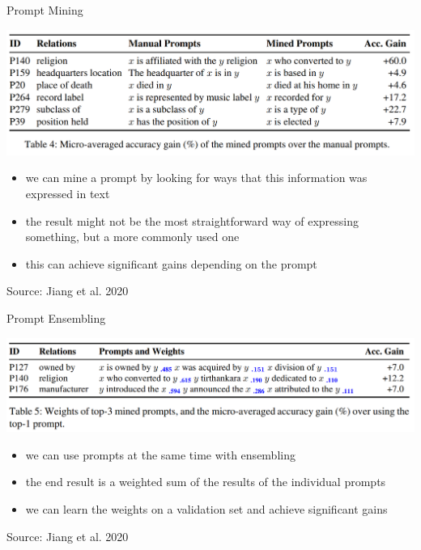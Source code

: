 \begin{vbframe}{Prompt Mining}
	\vfill

	\includegraphics[width=\textwidth]{evaluation_figures/mined_prompts.png}

	\begin{itemize}
		\item we can mine a prompt by looking for ways that this information was expressed in text
		\item the result might not be the most straightforward way of expressing something, but a more commonly used one
		\item this can achieve significant gains depending on the prompt
	\end{itemize}
	\tiny
	Source: Jiang et al. 2020
\end{vbframe}	

\begin{vbframe}{Prompt Ensembling}
	\vfill

	\includegraphics[width=\textwidth]{evaluation_figures/ensembled_prompts.png}

	\begin{itemize}
		\item we can use prompts at the same time with ensembling
		\item the end result is a weighted sum of the results of the individual prompts
		\item we can learn the weights on a validation set and achieve significant gains
	\end{itemize}
	\tiny
	Source: Jiang et al. 2020
\end{vbframe}	

